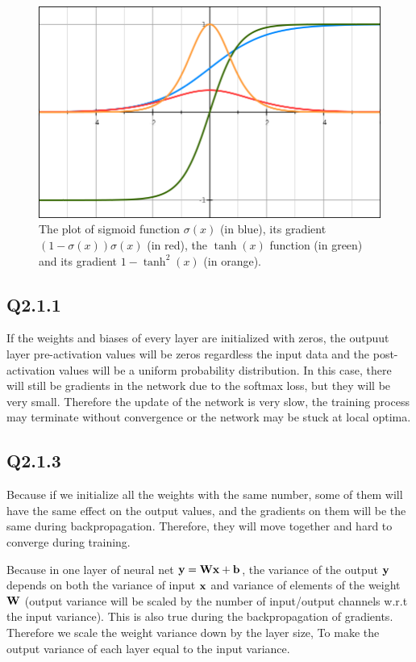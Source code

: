 \documentclass[11pt]{article}
\begin{document}
\begin{figure}[h!]
    \centering
    \includegraphics[width=.6\linewidth]{../results/q1_6_1.png}
    \caption{The plot of sigmoid function $\sigma(x)$ (in blue), its gradient $(1-\sigma(x))\sigma(x)$ (in red), the $\tanh(x)$ function (in green) and its gradient $1-\tanh^2(x)$ (in orange). }
    \label{fig:q1.6.1}
\end{figure}

\newpage

\subsection*{Q2.1.1}

If the weights and biases of every layer are initialized with zeros, the outpuut layer pre-activation values will be zeros regardless the input data and the post-activation values will be a uniform probability distribution.
In this case, there will still be gradients in the network due to the softmax loss, but they will be very small. Therefore the update of the network is very slow, the training process may terminate without convergence or the network may be stuck at local optima.

\newpage

\subsection*{Q2.1.3}

Because if we initialize all the weights with the same number, some of them will have the same effect on the output values, and the gradients on them will be the same during backpropagation. Therefore, they will move together and hard to converge during training.

Because in one layer of neural net $\mathbf{y}=\mathbf{W}\mathbf{x}+\mathbf{b}$, the variance of the output $\mathbf{y}$ depends on both the variance of input $\mathbf{x}$ and variance of elements of the weight $\mathbf{W}$ (output variance will be scaled by the number of input/output channels w.r.t the input variance). This is also true during the backpropagation of gradients. Therefore we scale the weight variance down by the layer size, To make the output variance of each layer equal to the input variance.
\end{document}
